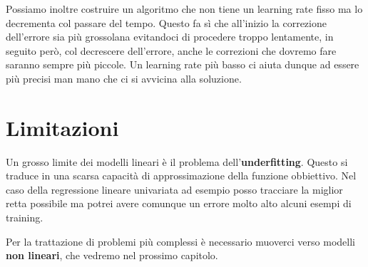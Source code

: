 Possiamo inoltre costruire un algoritmo che non tiene un learning rate fisso ma lo decrementa col passare del tempo.
Questo fa s\`i che all'inizio la correzione dell'errore sia pi\`u grossolana evitandoci di procedere troppo lentamente,
in seguito per\`o, col decrescere dell'errore, anche le correzioni che dovremo fare saranno sempre pi\`u piccole. Un
learning rate pi\`u basso ci aiuta dunque ad essere pi\`u precisi man mano che ci si avvicina alla soluzione.

\section{Limitazioni}
Un grosso limite dei modelli lineari \`e il problema dell'\textbf{underfitting}. Questo si traduce in una scarsa
capacit\`a di approssimazione della funzione obbiettivo. Nel caso della regressione lineare univariata ad esempio posso
tracciare la miglior retta possibile ma potrei avere comunque un errore molto alto alcuni esempi di training.

Per la trattazione di problemi pi\`u complessi \`e necessario muoverci verso modelli \textbf{non lineari}, che vedremo nel
prossimo capitolo.
